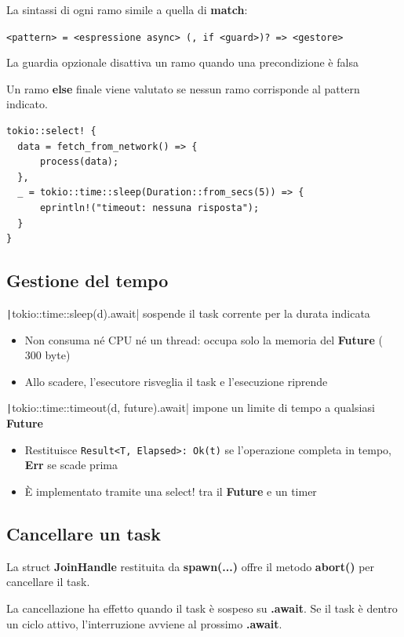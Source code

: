 La sintassi di ogni ramo simile a quella di \textbf{match}:

\verb|<pattern> = <espressione async> (, if <guard>)? => <gestore>|

La guardia opzionale disattiva un ramo quando una precondizione è falsa

Un ramo \textbf{else} finale viene valutato se nessun ramo corrisponde al pattern indicato.

\begin{verbatim}
tokio::select! {
  data = fetch_from_network() => {
      process(data);
  },
  _ = tokio::time::sleep(Duration::from_secs(5)) => {
      eprintln!("timeout: nessuna risposta");
  }
}
\end{verbatim}

\subsection{Gestione del tempo}

\texttt|tokio::time::sleep(d).await| sospende il task corrente per la durata indicata

\begin{itemize}
  \item Non consuma né CPU né un thread: occupa solo la memoria del \textbf{Future} (~ 300 byte)
  \item Allo scadere, l'esecutore risveglia il task e l'esecuzione riprende
\end{itemize}

\texttt|tokio::time::timeout(d, future).await| impone un limite di tempo a
qualsiasi \textbf{Future}

\begin{itemize}
  \item Restituisce \verb|Result<T, Elapsed>: Ok(t)| se l'operazione completa in tempo, \textbf{Err} se scade prima
  \item È implementato tramite una select! tra il \textbf{Future} e un timer
\end{itemize}

\subsection{Cancellare un task}

La struct \textbf{JoinHandle} restituita da \textbf{spawn(...)}
offre il metodo \textbf{abort()} per
cancellare il task.


La cancellazione ha effetto quando il task è sospeso su \textbf{.await}.
Se il task è dentro un ciclo attivo, l'interruzione avviene al prossimo \textbf{.await}.

